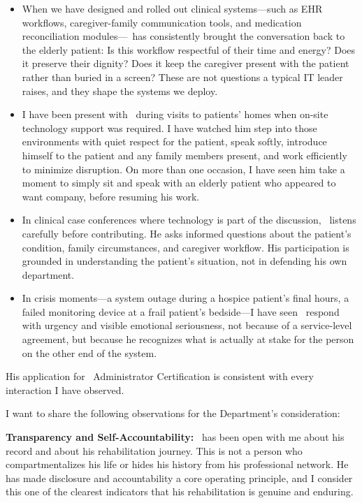 \begin{itemize}[leftmargin=2em, itemsep=0.2em]
  \item When we have designed and rolled out clinical systems---such as EHR workflows, caregiver-family communication tools, and medication reconciliation modules---\ApplicantName\ has consistently brought the conversation back to the elderly patient: Is this workflow respectful of their time and energy? Does it preserve their dignity? Does it keep the caregiver present with the patient rather than buried in a screen? These are not questions a typical IT leader raises, and they shape the systems we deploy.
  \item I have been present with \ApplicantName\ during visits to patients' homes when on-site technology support was required. I have watched him step into those environments with quiet respect for the patient, speak softly, introduce himself to the patient and any family members present, and work efficiently to minimize disruption. On more than one occasion, I have seen him take a moment to simply sit and speak with an elderly patient who appeared to want company, before resuming his work.
  \item In clinical case conferences where technology is part of the discussion, \ApplicantName\ listens carefully before contributing. He asks informed questions about the patient's condition, family circumstances, and caregiver workflow. His participation is grounded in understanding the patient's situation, not in defending his own department.
  \item In crisis moments---a system outage during a hospice patient's final hours, a failed monitoring device at a frail patient's bedside---I have seen \ApplicantName\ respond with urgency and visible emotional seriousness, not because of a service-level agreement, but because he recognizes what is actually at stake for the person on the other end of the system.
\end{itemize}

His application for \FacilityTypeShort\ Administrator Certification is consistent with every interaction I have observed.


I want to share the following observations for the Department's consideration:

\textbf{Transparency and Self-Accountability:} \ApplicantName\ has been open with me about his record and about his rehabilitation journey. This is not a person who compartmentalizes his life or hides his history from his professional network. He has made disclosure and accountability a core operating principle, and I consider this one of the clearest indicators that his rehabilitation is genuine and enduring.

